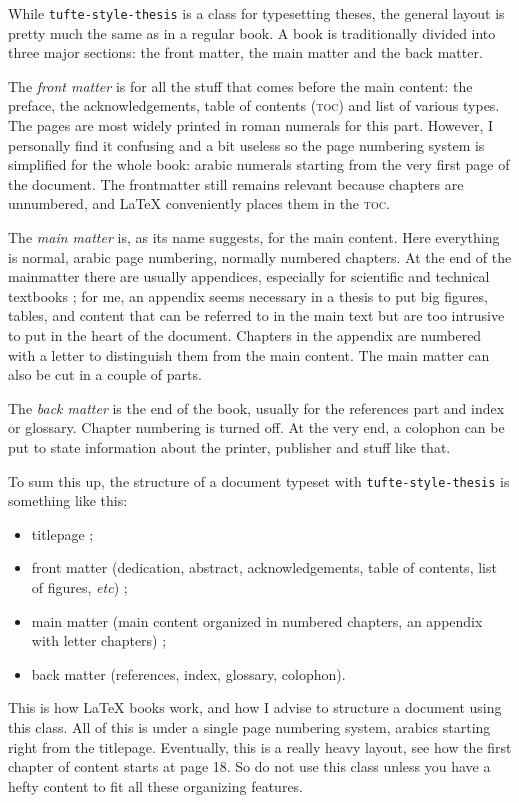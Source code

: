 \documentclass[
    11pt,
]{tufte-style-thesis}
\begin{document}
While \texttt{tufte-style-thesis} is a class for typesetting theses, the general layout is pretty much the same as in a regular book. A book is traditionally divided into three major sections: the front matter, the main matter and the back matter.

The \textit{front matter} is for all the stuff that comes before the main content: the preface, the acknowledgements, table of contents (\textsc{toc}) and list of various types. The pages are most widely printed in roman numerals for this part. However, I personally find it confusing and a bit useless so the page numbering system is simplified for the whole book: arabic numerals starting from the very first page of the document. The frontmatter still remains relevant because chapters are unnumbered, and \LaTeX{} conveniently places them in the \textsc{toc}.

The \textit{main matter} is, as its name suggests, for the main content. Here everything is normal, arabic page numbering, normally numbered chapters. At the end of the mainmatter there are usually appendices, especially for scientific and technical textbooks ; for me, an appendix seems necessary in a thesis to put big figures, tables, and content that can be referred to in the main text but are too intrusive to put in the heart of the document. Chapters in the appendix are numbered with a letter to distinguish them from the main content. The main matter can also be cut in a couple of parts.

The \textit{back matter} is the end of the book, usually for the references part and index or glossary. Chapter numbering is turned off. At the very end, a colophon can be put to state information about the printer, publisher and stuff like that.

To sum this up, the structure of a document typeset with \texttt{tufte-style-thesis} is something like this:
\begin{itemize}
  \item titlepage ;
  \item front matter (dedication, abstract, acknowledgements, table of contents, list of figures, \textit{etc}) ;
  \item main matter (main content organized in numbered chapters, an appendix with letter chapters) ;
  \item back matter (references, index, glossary, colophon).
\end{itemize}
This is how \LaTeX{} books work, and how I advise to structure a document using this class. All of this is under a single page numbering system, arabics starting right from the titlepage. Eventually, this is a really heavy layout, see how the first chapter of content starts at page 18. So do not use this class unless you have a hefty content to fit all these organizing features.
\end{document}
